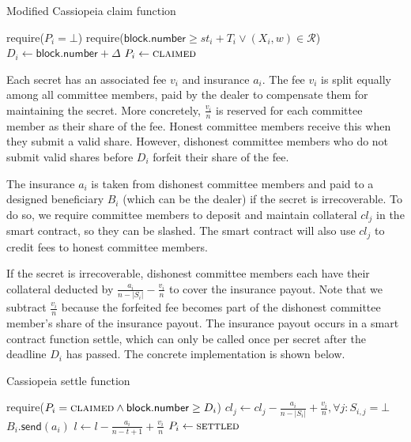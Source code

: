 \begin{algorithm}[H]
\caption{Modified Cassiopeia \textsf{claim} function}
    \begin{algorithmic}[1]
                \State require($P_i = \bot$)
                \State require($\textsf{block.number} \geq st_i + T_i \lor (X_i, w) \in \mathcal{R}$)
                \State $D_i \gets \textsf{block.number} + \Delta$
                \State $P_i \gets \textsc{claimed}$
            \EndFunction
    \end{algorithmic}
\end{algorithm}

Each secret has an associated fee $v_i$ and insurance $a_i$.
The fee $v_i$ is split equally among all committee members, paid by the dealer to compensate them for maintaining the secret.
More concretely, $\frac{v_i}{n}$ is reserved for each committee member as their share of the fee.
Honest committee members receive this when they submit a valid share.
However, dishonest committee members who do not submit valid shares before $D_i$ forfeit their share of the fee.

The insurance $a_i$ is taken from dishonest committee members and paid to a designed beneficiary $B_i$ (which can be the dealer) if the secret is irrecoverable.
To do so, we require committee members to deposit and maintain collateral $cl_j$ in the smart contract, so they can be slashed.
The smart contract will also use $cl_j$ to credit fees to honest committee members.

If the secret is irrecoverable, dishonest committee members each have their collateral deducted by $\frac{a_i}{n - |S_i|} - \frac{v_i}{n}$ to cover the insurance payout.
Note that we subtract $\frac{v_i}{n}$ because the forfeited fee becomes part of the dishonest committee member's share of the insurance payout.
The insurance payout occurs in a smart contract function \textsf{settle}, which can only be called once per secret after the deadline $D_i$ has passed.
The concrete implementation is shown below.

\begin{algorithm}[H]
\caption{Cassiopeia \textsf{settle} function}
    \begin{algorithmic}[1]
                \State require($P_i = \textsc{claimed} \land \textsf{block.number} \geq D_i$)
                    \State $cl_j \gets cl_j - \frac{a_i}{n - |S_i|} + \frac{v_i}{n}, \forall j : S_{i,j} = \bot$
                    \State $B_i.\textsf{send}(a_i)$
                \EndIf
                \State $l \gets l - \frac{a_i}{n-t+1} + \frac{v_i}{n}$
                \State $P_i \gets \textsc{settled}$
            \EndFunction
    \end{algorithmic}
\end{algorithm}


